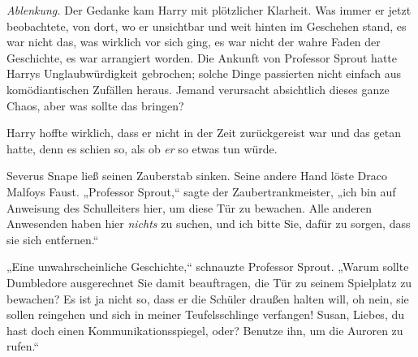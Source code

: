 \emph{Ablenkung.}
Der Gedanke kam Harry mit plötzlicher Klarheit. Was immer er jetzt beobachtete, von dort, wo er unsichtbar und weit hinten im Geschehen stand, es war nicht das, was wirklich vor sich ging, es war nicht der wahre Faden der Geschichte, es war arrangiert worden. Die Ankunft von Professor Sprout hatte Harrys Unglaubwürdigkeit gebrochen; solche Dinge passierten nicht einfach aus komödiantischen Zufällen heraus.
Jemand verursacht absichtlich dieses ganze Chaos, aber was sollte das bringen?

Harry hoffte wirklich, dass er nicht in der Zeit zurückgereist war und das getan hatte, denn es schien so, als ob \emph{er} so etwas tun würde.

Severus Snape ließ seinen Zauberstab sinken. Seine andere Hand löste Draco Malfoys Faust. „Professor Sprout,“ sagte der Zaubertrankmeister, „ich bin auf Anweisung des Schulleiters hier, um diese Tür zu bewachen. Alle anderen Anwesenden haben hier \emph{nichts} zu suchen, und ich bitte Sie, dafür zu sorgen, dass sie sich entfernen.“

„Eine unwahrscheinliche Geschichte,“ schnauzte Professor Sprout. „Warum sollte Dumbledore ausgerechnet Sie damit beauftragen, die Tür zu seinem Spielplatz zu bewachen? Es ist ja nicht so, dass er die Schüler draußen halten will, oh nein, sie sollen reingehen und sich in meiner Teufelsschlinge verfangen! Susan, Liebes, du hast doch einen Kommunikationsspiegel, oder? Benutze ihn, um die Auroren zu rufen.“

